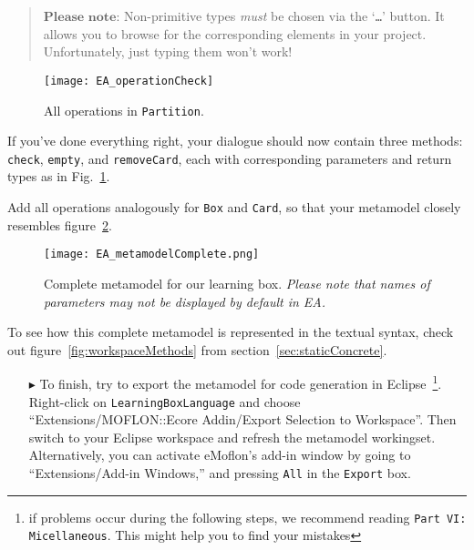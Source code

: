 \vspace{-.5cm}
\begin{quote}
$\textbf{Please note:}$ Non-primitive types \emph{must} be chosen via the `\texttt{\ldots}' button. It allows you to browse for the corresponding elements in your project. Unfortunately, just typing them won't work!
\end{quote}


\begin{figure}[htbp]
	\centering
  \texttt{[image: EA\_operationCheck]}
	\caption{All operations in \texttt{Partition}.}
	\label{fig:operation_partition}
\end{figure}

If you've done everything right, your dialogue should now contain three methods: \texttt{check}, \texttt{empty}, and \texttt{removeCard}, each with corresponding parameters and return types as in Fig.~\ref{fig:operation_partition}.

Add all operations analogously for \texttt{Box} and \texttt{Card}, so that your metamodel closely resembles figure~\ref{fig:metamodel_complete}.

\begin{figure}[htbp]
	\centering
  \texttt{[image: EA\_metamodelComplete.png]}
	\caption[Complete metamodel for our learning box.]{Complete metamodel for our learning box. \emph{\small Please note that names of parameters may not be displayed by default in EA.}}
	\label{fig:metamodel_complete}
\end{figure}

\pagebreak

To see how this complete metamodel is represented in the textual syntax, check out figure~\ref{fig:workspaceMethods} from section~\ref{sec:staticConcrete}.

\begin{enumerate}
\item[$\blacktriangleright$] To finish, try to export the metamodel for code generation in Eclipse~\footnote{if problems occur during the following steps, we recommend reading \texttt{Part VI: Micellaneous}. This might help you to find your mistakes}. Right-click on \texttt{LearningBoxLanguage} and choose ``Extensions/MOFLON::Ecore Addin/Export Selection to Workspace''.
Then switch to your Eclipse work\-space and refresh the metamodel workingset. Alternatively, you can activate eMoflon's add-in window by going to ``Extensions/Add-in Windows,'' and pressing \texttt{All} in the \texttt{Export} box.
\end{enumerate}


